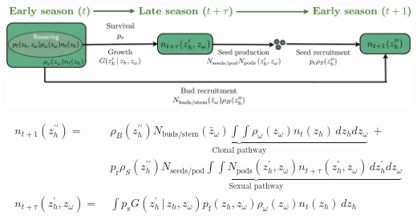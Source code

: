 \documentclass[10pt]{article}
\begin{document}
\begin{framed}

\begin{center}
\includegraphics[width=5.5in]{LifeCycleDiagram.pdf}

\begin{align*}
n_{t+1}(z_{h}^{\prime\prime}) = \ & \underbrace{\rho_{B}(z_{h}^{\prime\prime})N_{\mathrm{buds/stem}}(\bar{z}_{\omega})\int\int \rho_{\omega}(z_{\omega})n_{t}(z_{h})\, dz_{h}dz_{\omega}}_\text{Clonal pathway} \ + \\
  & \underbrace{p_{\mathrm{r}}\rho_{S}(z_{h}^{\prime\prime})N_{\mathrm{seeds/pod}}\int\int N_{\mathrm{pods}}\left(z_{h}^{\prime},z_{\omega}\right)n_{t+\tau}(z_{h}^{\prime},z_{\omega}) \,dz_{h}^{\prime}dz_{\omega}}_\text{Sexual pathway} \\
n_{t+\tau}(z_{h}^{\prime},z_{\omega}) = \ & \int p_{\mathrm{s}} G(z_{h}^{\prime}\, | \, z_{h},z_{\omega})p_{\mathrm{f}}(z_{h},z_{\omega})\rho_{\omega}(z_{\omega})n_{t}(z_{h})\, dz_{h}
\end{align*}

\end{center}

\vspace{0.35in}


\end{framed}
\end{document}
